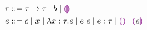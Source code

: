 \begin{align*}
  \tau &::= \tau\to\tau
         \mid b
         \mid \tehole \\
  e &::= c
      \mid x
      \mid\lambda x:\tau.e
      \mid e\ e
      \mid e:\tau
      \mid \hehole
      \mid \hhole{e}
\end{align*}
